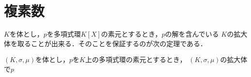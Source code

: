 \section{複素数}
	$K$を体とし，$p$を多項式環$K[X]$の素元とするとき，$p$の解を含んでいる
	$K$の拡大体を取ることが出来る．そのことを保証するのが次の定理である．
	
	\begin{screen}
		\begin{thm}[単拡大]
			$(K,\sigma,\mu)$を体とし，$p$を$K$上の多項式環の素元とするとき，
			$(K,\sigma,\mu)$の拡大体で$p$
		\end{thm}
	\end{screen}